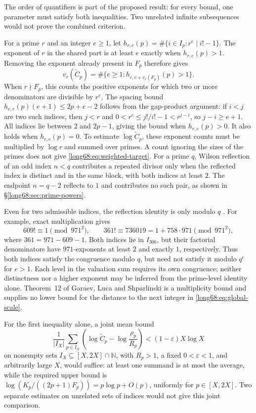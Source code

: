 The order of quantifiers is part of the proposed result: for every bound,
one parameter must satisfy both inequalities. Two unrelated infinite
subsequences would not prove the combined criterion.

For a prime $r$ and an integer $e\ge1$, let
$h_{r,e}(p)=\#\{i\in I_p:r^e\mid i!-1\}$. The exponent of $r$ in the
shared part is at least $e$ exactly when $h_{r,e}(p)>1$.
Removing the exponent already present in $F_p$ therefore gives
\[
 v_r(\widetilde C_p)
 =\#\{e\ge1:h_{r,e+v_r(F_p)}(p)>1\}.
\]
When $r\nmid F_p$, this counts the positive exponents for which two or
more denominators are divisible by $r^e$. The spacing bound
$h_{r,e}(p)(e+1)\le2p+e-2$ follows from the gap-product argument:
if $i<j$ are two such indices, then $j<r$ and
$0<r^e\le j!/i!-1<r^{j-i}$, so $j-i\ge e+1$. All indices lie between
$2$ and $2p-1$, giving the bound when $h_{r,e}(p)>0$. It also holds when $h_{r,e}(p)=0$.
To estimate $\log\widetilde C_p$, these exponent counts must be multiplied
by $\log r$ and summed over primes. A count ignoring the sizes of the
primes does not give \eqref{long68:eq:weighted-target}. For a prime $q$,
Wilson reflection of an odd index $n<q$ contributes a repeated divisor
only when the reflected index is distinct and in the same block, with
both indices at least $2$. The endpoint $n=q-2$ reflects to $1$ and
contributes no such pair, as shown in \S\ref{long68:sec:prime-powers}.

Even for two admissible indices, the reflection identity is only modulo
$q$ \cite[(4), p.~462]{stewart2004}. For example, exact multiplication gives
\[
 609!\equiv1\pmod{971^2},\qquad
 361!\equiv736019=1+758\cdot971\pmod{971^2},
\]
where $361=971-609-1$. Both indices lie in $I_{306}$, but their factorial
denominators have $971$-exponents at least $2$ and exactly $1$, respectively.
Thus both indices satisfy the congruence modulo $q$, but need not satisfy
it modulo $q^e$ for $e>1$. Each level in the valuation sum requires its own
congruence; neither distinctness nor a higher exponent may be inferred
from the prime-level identity alone.
Theorem~12 of Garaev, Luca and Shparlinski
\cite[arXiv v1, Thm.~12, p.~16]{garaev-luca-shparlinski} is a multiplicity
bound and supplies no lower bound for the distance to the next integer in
\eqref{long68:eq:global-scale}.

For the first inequality alone, a joint mean bound
\[
 \frac1{|I_X|}\sum_{p\in I_X}
 \left(\log\widetilde C_p-\log\frac{\rho_p}{R_p}\right)
 <(1-\varepsilon)X\log X
\]
on nonempty sets $I_X\subseteq[X,2X]\cap\mathbb N$, with $R_p>1$, a fixed
$0<\varepsilon<1$, and arbitrarily large $X$, would suffice: at least one
summand is at most the average, while the required upper bound is
$\log(K_p/((2p+1)F_p))=p\log p+O(p)$, uniformly for $p\in[X,2X]$.
Two separate estimates on unrelated sets of indices would not give this
joint comparison.

